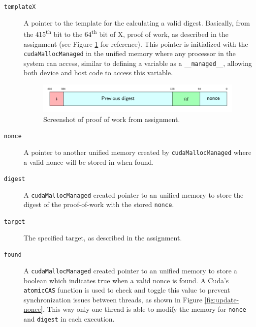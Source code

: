 \documentclass[a4paper]{article}
\begin{document}
\begin{description}
\item[{\texttt{templateX}}]A pointer to the template for the calculating a valid digest. Basically, from the 415\textsuperscript{th} bit to the 64\textsuperscript{th} bit of X, proof of work, as described in the assignment (see Figure \ref{fig:proof-of-work} for reference). This pointer is initialized with the \texttt{cudaMallocManaged} in the unified memory where any processor in the system can access, similar to defining a variable as a \texttt{\_\_managed\_\_}, allowing both device and host code to access this variable.
\begin{figure}
\includegraphics[width=1\textwidth]{Screenshot_3.png}
\caption{\label{fig:proof-of-work}Screenshot of proof of work from assignment.}
\end{figure}

\item[{\texttt{nonce}}]A pointer to another unified memory created by \texttt{cudaMallocManaged} where a valid nonce will be stored in when found. 

\item[{\texttt{digest}}]A \texttt{cudaMallocManaged} created pointer to an unified memory to store the digest of the proof-of-work with the stored \texttt{nonce}.

\item[{\texttt{target}}]The specified target, as described in the assignment.

\item[{\texttt{found}}]A \texttt{cudaMallocManaged} created pointer to an unified memory to store a boolean which indicates true when a valid nonce is found. A Cuda's \texttt{atomicCAS} function is used to check and toggle this value to prevent synchronization issues between threads, as shown in Figure \ref{fig:update-nonce}. This way only one thread is able to modify the memory for \texttt{nonce} and \texttt{digest} in each execution.
\end{description}
\end{document}
